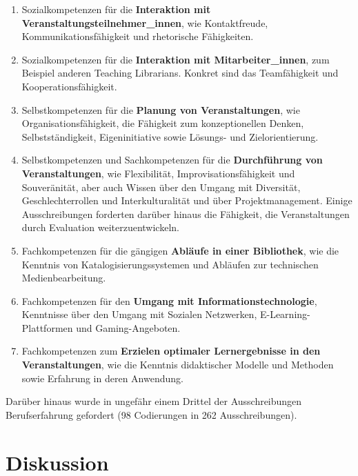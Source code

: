 \documentclass[a4paper,
fontsize=11pt,
oneside,
numbers=noperiodatend,
parskip=half-,
bibliography=totoc,
final
]{scrartcl}
\begin{document}
\begin{enumerate}
\def\labelenumi{\arabic{enumi}.}
\item
  Sozialkompetenzen für die \textbf{Interaktion mit
  Veranstaltungsteilnehmer\_innen}, wie Kontaktfreude,
  Kommunikationsfähigkeit und rhetorische Fähigkeiten.
\item
  Sozialkompetenzen für die \textbf{Interaktion mit Mitarbeiter\_innen},
  zum Beispiel anderen Teaching Librarians. Konkret sind das
  Teamfähigkeit und Kooperationsfähigkeit.
\item
  Selbstkompetenzen für die \textbf{Planung von Veranstaltungen}, wie
  Organisationsfähigkeit, die Fähigkeit zum konzeptionellen Denken,
  Selbstständigkeit, Eigeninitiative sowie Lösungs- und
  Zielorientierung.
\item
  Selbstkompetenzen und Sachkompetenzen für die \textbf{Durchführung von
  Veranstaltungen}, wie Flexibilität, Improvisationsfähigkeit und
  Souveränität, aber auch Wissen über den Umgang mit Diversität,
  Geschlechterrollen und Interkulturalität und über Projektmanagement.
  Einige Ausschreibungen forderten darüber hinaus die Fähigkeit, die
  Veranstaltungen durch Evaluation weiterzuentwickeln.
\item
  Fachkompetenzen für die gängigen \textbf{Abläufe in einer Bibliothek},
  wie die Kenntnis von Katalogisierungssystemen und Abläufen zur
  technischen Medienbearbeitung.
\item
  Fachkompetenzen für den \textbf{Umgang mit Informationstechnologie},
  Kenntnisse über den Umgang mit Sozialen Netzwerken,
  E-Learning-Plattformen und Gaming-Angeboten.
\item
  Fachkompetenzen zum \textbf{Erzielen optimaler Lernergebnisse in den
  Veranstaltungen}, wie die Kenntnis didaktischer Modelle und Methoden
  sowie Erfahrung in deren Anwendung.
\end{enumerate}

Darüber hinaus wurde in ungefähr einem Drittel der Ausschreibungen
Berufserfahrung gefordert (98 Codierungen in 262 Ausschreibungen).

\hypertarget{diskussion}{%
\section{Diskussion}\label{diskussion}}
\end{document}
